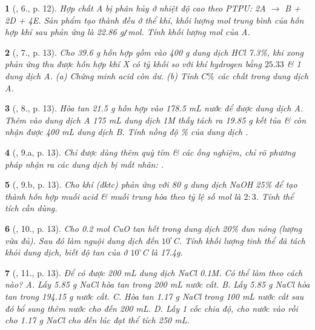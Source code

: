\documentclass{article}
\newtheorem{baitoan}{}
\begin{document}
\begin{baitoan}[\cite{An_400_BT_Hoa_Hoc_9}, 6., p. 12]
	Hợp chất A bị phân hủy ở nhiệt độ cao theo {\rm PTPƯ: 2A $\to$ B + 2D + 4E}. Sản phẩm tạo thành đều ở thể khí, khối lượng mol trung bình của hỗn hợp khí sau phản ứng là {\rm22.86 g{\tt/}mol}. Tính khối lượng mol của A.
\end{baitoan}

\begin{baitoan}[\cite{An_400_BT_Hoa_Hoc_9}, 7., p. 13]
	Cho {\rm39.6 g} hỗn hợp gồm {\rm{}} vào {\rm400 g} dung dịch {\rm HCl 7.3\%}, khi xong phản ứng thu được hỗn hợp khí X có tỷ khối so với khí hydrogen bằng $25.33$ \& 1 dung dịch A. (a) Chứng minh acid còn dư. (b) Tính $C\%$ các chất trong dung dịch A.
\end{baitoan}

\begin{baitoan}[\cite{An_400_BT_Hoa_Hoc_9}, 8., p. 13]
	Hòa tan {\rm21.5 g} hỗn hợp {\rm{}} vào {\rm178.5 mL} nước để được dung dịch A. Thêm vào dung dịch A {\rm175 mL} dung dịch {\rm{} 1M} thấy tách ra {\rm19.85 g} kết tủa \& còn nhận được {\rm400 mL} dung dịch B. Tính nồng độ {\rm\%} của dung dịch {\rm{}}.
\end{baitoan}

\begin{baitoan}[\cite{An_400_BT_Hoa_Hoc_9}, 9.a, p. 13]
	Chỉ được dùng thêm quỳ tím \& các ống nghiệm, chỉ rõ phương pháp nhận ra các dung dịch bị mất nhãn: {\rm{}}.
\end{baitoan}

\begin{baitoan}[\cite{An_400_BT_Hoa_Hoc_9}, 9.b, p. 13]
	Cho khí {\rm{}} (đktc) phản ứng với {\rm80 g} dung dịch {\rm NaOH 25\%} để tạo thành hỗn hợp muối acid \& muối trung hòa theo tỷ lệ số mol là $2:3$. Tính thể tích {\rm{}} cần dùng.
\end{baitoan}

\begin{baitoan}[\cite{An_400_BT_Hoa_Hoc_9}, 10., p. 13]
	Cho {\rm0.2 mol CuO} tan hết trong dung dịch {\rm{} 20\%} đun nóng (lượng vừa đủ). Sau đó làm nguội dung dịch đến $10^\circ${\rm C}. Tính khối lượng tinh thể {\rm{}} đã tách khỏi dung dịch, biết độ tan của {\rm{}} ở $10^\circ${\rm C} là {\rm17.4g}.
\end{baitoan}

\begin{baitoan}[\cite{An_400_BT_Hoa_Hoc_9}, 11., p. 13]
	Để có được {\rm200 mL} dung dịch {\rm NaCl 0.1M}. Có thể làm theo cách nào? {\sf A.} Lấy {\rm5.85 g NaCl} hòa tan trong {\rm200 mL} nước cất. {\sf B.} Lấy {\rm5.85 g NaCl} hòa tan trong {\rm194.15 g} nước cất. {\sf C.} Hòa tan {\rm1.17 g NaCl} trong {\rm100 mL} nước cất sau đó bổ sung thêm nước cho đến {\rm200 mL}. {\sf D.} Lấy 1 cốc chia độ, cho nước vào rồi cho {\rm1.17 g NaCl} cho đến lúc đạt thể tích {\rm250 mL}.
\end{baitoan}
\end{document}
